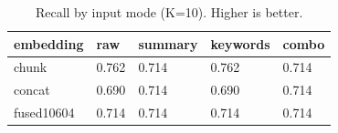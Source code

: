 \begin{table}
\caption{Recall by input mode (K=10). Higher is better.}
\label{tab:recall-by-mode}
\begin{tabular}{lllll}
\toprule
embedding & raw & summary & keywords & combo \\
\midrule
chunk & 0.762 & 0.714 & 0.762 & 0.714 \\
concat & 0.690 & 0.714 & 0.690 & 0.714 \\
fused10604 & 0.714 & 0.714 & 0.714 & 0.714 \\
\bottomrule
\end{tabular}
\end{table}
